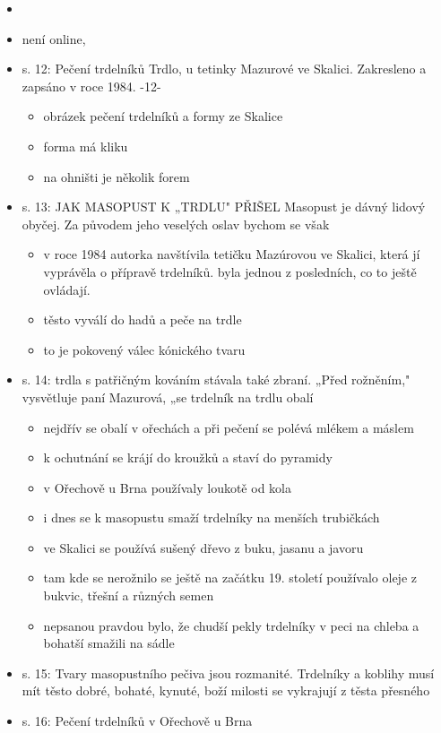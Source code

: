 \begin{itemize}
  \begin{itemize}
  \tightlist
  \item
  \item
    není online,
  \item
    s. 12: Pečení trdelníků Trdlo, u tetinky Mazurové ve Skalici.
    Zakresleno a zapsáno v roce 1984. -12-

    \begin{itemize}
    \tightlist
    \item
      obrázek pečení trdelníků a formy ze Skalice
    \item
      forma má kliku
    \item
      na ohništi je několik forem
    \end{itemize}
  \item
    s. 13: JAK MASOPUST K „TRDLU" PŘIŠEL Masopust je dávný lidový
    obyčej. Za původem jeho veselých oslav bychom se však

    \begin{itemize}
    \tightlist
    \item
      v roce 1984 autorka navštívila tetičku Mazúrovou ve Skalici, která
      jí vyprávěla o přípravě trdelníků. byla jednou z posledních, co to
      ještě ovládají.
    \item
      těsto vyválí do hadů a peče na trdle
    \item
      to je pokovený válec kónického tvaru
    \end{itemize}
  \item
    s. 14: trdla s patřičným kováním stávala také zbraní. „Před
    rožněním," vysvětluje paní Mazurová, „se trdelník na trdlu obalí

    \begin{itemize}
    \tightlist
    \item
      nejdřív se obalí v ořechách a při pečení se polévá mlékem a máslem
    \item
      k ochutnání se krájí do kroužků a staví do pyramidy
    \item
      v Ořechově u Brna používaly loukotě od kola
    \item
      i dnes se k masopustu smaží trdelníky na menších trubičkách
    \item
      ve Skalici se používá sušený dřevo z buku, jasanu a javoru
    \item
      tam kde se nerožnilo se ještě na začátku 19. století používalo
      oleje z bukvic, třešní a různých semen
    \item
      nepsanou pravdou bylo, že chudší pekly trdelníky v peci na chleba
      a bohatší smažili na sádle
    \end{itemize}
  \item
    s. 15: Tvary masopustního pečiva jsou rozmanité. Trdelníky a koblihy
    musí mít těsto dobré, bohaté, kynuté, boží milosti se vykrajují z
    těsta přesného
  \item
    s. 16: Pečení trdelníků v Ořechově u Brna


\end{itemize}
\end{itemize}
